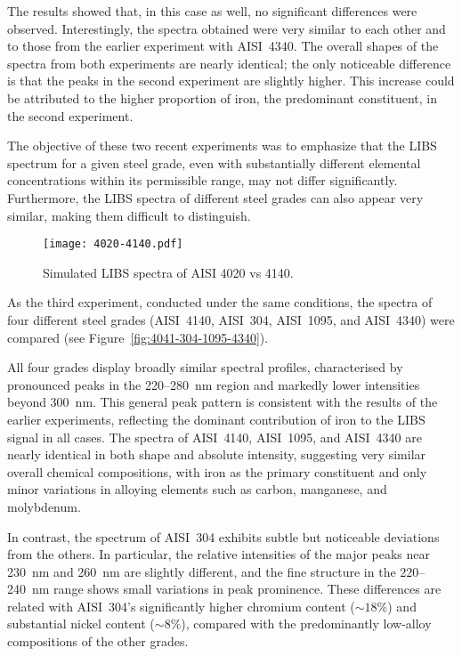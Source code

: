 \documentclass[12pt,a4paper]{article}
\begin{document}
	The results showed that, in this case as well, no significant differences were observed. Interestingly, the spectra obtained were very similar to each other and to those from the earlier experiment with AISI~4340. The overall shapes of the spectra from both experiments are nearly identical; the only noticeable difference is that the peaks in the second experiment are slightly higher. This increase could be attributed to the higher proportion of iron, the predominant constituent, in the second experiment. 
	
	The objective of these two recent experiments was to emphasize that the LIBS spectrum for a given steel grade, even with substantially different elemental concentrations within its permissible range, may not differ significantly. Furthermore, the LIBS spectra of different steel grades can also appear very similar, making them difficult to distinguish. 
	
	
	\begin{figure}[h!]
		\centering
		\texttt{[image: 4020-4140.pdf]}
		\caption{Simulated LIBS spectra of AISI 4020 vs 4140.}
		\label{fig:4020-4140}
	\end{figure} 

 	
 	As the third experiment, conducted under the same conditions, the spectra of four different steel grades (AISI~4140, AISI~304, AISI~1095, and AISI~4340) were compared (see Figure~\ref{fig:4041-304-1095-4340}).  
 	
 	All four grades display broadly similar spectral profiles, characterised by pronounced peaks in the 220--280~nm region and markedly lower intensities beyond 300~nm. This general peak pattern is consistent with the results of the earlier experiments, reflecting the dominant contribution of iron to the LIBS signal in all cases. The spectra of AISI~4140, AISI~1095, and AISI~4340 are nearly identical in both shape and absolute intensity, suggesting very similar overall chemical compositions, with iron as the primary constituent and only minor variations in alloying elements such as carbon, manganese, and molybdenum.  
 	
 	In contrast, the spectrum of AISI~304 exhibits subtle but noticeable deviations from the others. In particular, the relative intensities of the major peaks near 230~nm and 260~nm are slightly different, and the fine structure in the 220--240~nm range shows small variations in peak prominence. These differences are related with AISI~304’s significantly higher chromium content (\(\sim18\%\)) and substantial nickel content (\(\sim8\%\)), compared with the predominantly low-alloy compositions of the other grades. 
 	
\end{document}
